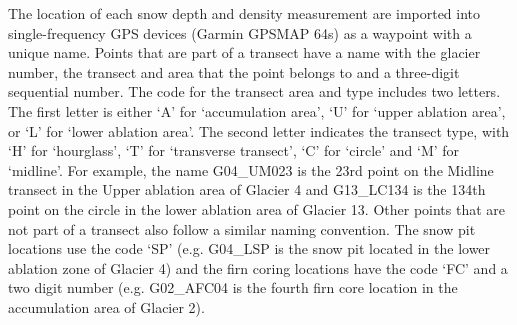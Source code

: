 \documentclass{sfuthesis}
\begin{document}
{\begin{appendices}
The location of each snow depth and density measurement are imported into single-frequency GPS devices (Garmin GPSMAP 64s) as a waypoint with a unique name. Points that are part of a transect have a name with the glacier number, the transect and area that the point belongs to and a three-digit sequential number. The code for the transect area and type includes two letters. The first letter is either `A' for `accumulation area', `U' for `upper ablation area', or `L' for `lower ablation area'. The second letter indicates the transect type, with `H' for `hourglass', `T' for `transverse transect', `C' for `circle' and `M' for `midline'. For example, the name G04\_UM023 is the 23rd point on the Midline transect in the Upper ablation area of Glacier 4 and G13\_LC134 is the 134th point on the circle in the lower ablation area of Glacier 13. Other points that are not part of a transect also follow a similar naming convention. The snow pit locations use the code `SP' (e.g. G04\_LSP is the snow pit located in the lower ablation zone of Glacier 4) and the firn coring locations have the code `FC' and a two digit number (e.g. G02\_AFC04 is the fourth firn core location in the accumulation area of Glacier 2).
	

\end{appendices}}
\end{document}
